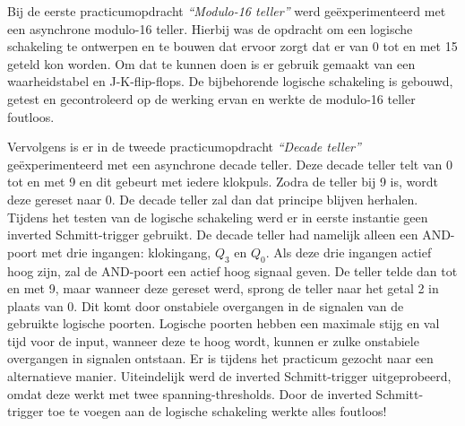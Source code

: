 \documentclass[12pt]{article}
\begin{document}
Bij de eerste practicumopdracht \textit{``Modulo-16 teller''} werd geëxperimenteerd met een asynchrone modulo-16 teller. 
Hierbij was de opdracht om een logische schakeling te ontwerpen en te bouwen dat ervoor zorgt dat er van 0 tot en met 15 geteld kon worden.
Om dat te kunnen doen is er gebruik gemaakt van een waarheidstabel en J-K-flip-flops. 
De bijbehorende logische schakeling is gebouwd, getest en gecontroleerd op de werking ervan en werkte de modulo-16 teller foutloos. 

Vervolgens is er in de tweede practicumopdracht \textit{``Decade teller''} geëxperimenteerd met een asynchrone decade teller. 
Deze decade teller telt van 0 tot en met 9 en dit gebeurt met iedere klokpuls. Zodra de teller bij 9 is, wordt deze gereset naar 0.
De decade teller zal dan dat principe blijven herhalen. 
Tijdens het testen van de logische schakeling werd er in eerste instantie geen inverted Schmitt-trigger gebruikt. 
De decade teller had namelijk alleen een AND-poort met drie ingangen: klokingang, $Q_3$ en $Q_0$. 
Als deze drie ingangen actief hoog zijn, zal de AND-poort een actief hoog signaal geven. 
De teller telde dan tot en met 9, maar wanneer deze gereset werd, sprong de teller naar het getal 2 in plaats van 0. 
Dit komt door onstabiele overgangen in de signalen van de gebruikte logische poorten. 
Logische poorten hebben een maximale stijg en val tijd voor de input, wanneer deze te hoog wordt, kunnen er zulke onstabiele overgangen in signalen ontstaan. 
Er is tijdens het practicum gezocht naar een alternatieve manier. Uiteindelijk werd de inverted Schmitt-trigger uitgeprobeerd, omdat deze werkt met twee spanning-thresholds. 
Door de inverted Schmitt-trigger toe te voegen aan de logische schakeling werkte alles foutloos!
\pagebreak
\end{document}
